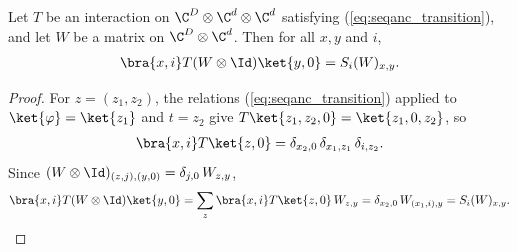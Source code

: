 \begin{lemma}
    \label{thm:seqanc_transition_step}
    \leanok
    Let $T$ be an interaction on $\C^D\otimes\C^d\otimes\C^d$ satisfying
    (\ref{eq:seqanc_transition}), and let $W$ be a matrix on $\C^D\otimes\C^d$.
    Then for all $x,y$ and $i$,
    \begin{align*}
        \bra{x,i}T(W\otimes\Id)\ket{y,0}=S_i(W)_{x,y}.
    \end{align*}
\end{lemma}
\begin{proof}
    \leanok
    For $z=(z_1,z_2)$, the relations (\ref{eq:seqanc_transition}) applied to
    $\ket{\varphi}=\ket{z_1}$ and $t=z_2$ give
    $T\ket{z_1,z_2,0}=\ket{z_1,0,z_2}$, so
    \begin{align*}
        \bra{x,i}T\ket{z,0}=\delta_{x_2,0}\,\delta_{x_1,z_1}\,\delta_{i,z_2}.
    \end{align*}
    Since $(W\otimes\Id)_{(z,j),(y,0)}=\delta_{j,0}\,W_{z,y}$,
    \begin{align*}
        \bra{x,i}T(W\otimes\Id)\ket{y,0}
        =\sum_z\bra{x,i}T\ket{z,0}\,W_{z,y}
        =\delta_{x_2,0}\,W_{(x_1,i),y}
        =S_i(W)_{x,y}.
    \end{align*}
\end{proof}

